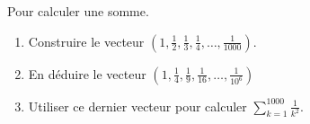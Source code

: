 \begin{exercice}\label{exoSC_serie2-0001}

	Pour calculer une somme.
	\begin{enumerate}

		\item
			Construire le vecteur $(1,\frac{ 1 }{2},\frac{1}{ 3 },\frac{1}{ 4 },\ldots,\frac{1}{ 1000 })$.
		\item
			En déduire le vecteur $(1,\frac{1}{ 4 },\frac{1}{ 9 },\frac{1}{ 16 },\ldots,\frac{1}{ 10^6 })$
		\item
			Utiliser ce dernier vecteur pour calculer $\sum_{k=1}^{1000}\frac{1}{ k^2 }$.

	\end{enumerate}

\end{exercice}
